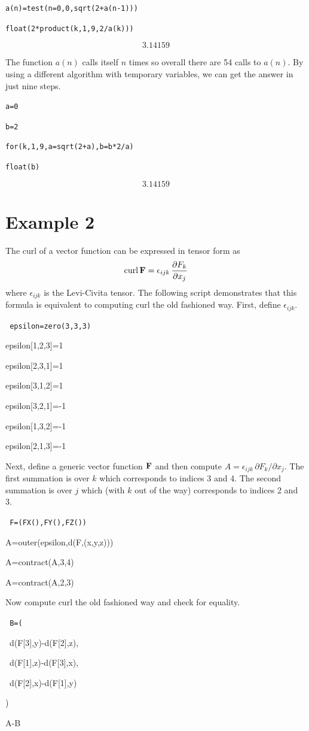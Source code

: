\documentclass[12pt]{book}
\begin{document}
\medskip
\verb$a(n)=test(n=0,0,sqrt(2+a(n-1)))$

\verb$float(2*product(k,1,9,2/a(k)))$

$$3.14159$$

\medskip
\noindent
The function $a(n)$ calls itself $n$ times so overall there are
54 calls to $a(n)$.
By using a different algorithm with temporary variables, we can get the
answer in just nine steps.

\medskip
\verb$a=0$

\verb$b=2$

\verb$for(k,1,9,a=sqrt(2+a),b=b*2/a)$

\verb$float(b)$

$$3.14159$$

\newpage

\label{example2}

\section*{Example 2}
The curl of a vector function can be expressed in tensor form as
$$\mathop{\rm curl}{\bf F}=\epsilon_{ijk}\,{\partial F_k\over\partial x_j}$$
where $\epsilon_{ijk}$ is the Levi-Civita tensor.
The following script demonstrates that this formula is equivalent
to computing curl the old fashioned way.
First, define $\epsilon_{ijk}$.

\medskip
{\tt
epsilon=zero(3,3,3)

epsilon[1,2,3]=1

epsilon[2,3,1]=1

epsilon[3,1,2]=1

epsilon[3,2,1]=-1

epsilon[1,3,2]=-1

epsilon[2,1,3]=-1
}

\medskip
\noindent
Next, define a generic vector function $\bf F$ and
then compute $A=\epsilon_{ijk}\,\partial F_k/\partial x_j$.
The first summation is over $k$ which corresponds to indices 3 and 4.
The second summation is over $j$ which (with $k$ out of the way)
corresponds to indices 2 and 3.

\medskip
{\tt
F=(FX(),FY(),FZ())

A=outer(epsilon,d(F,(x,y,z)))

A=contract(A,3,4)

A=contract(A,2,3)
}

\medskip
\noindent
Now compute curl the old fashioned way and check for equality.

\medskip
{\tt
B=(

\ d(F[3],y)-d(F[2],z),

\ d(F[1],z)-d(F[3],x),

\ d(F[2],x)-d(F[1],y)

)

\medskip
A-B
}
\end{document}
